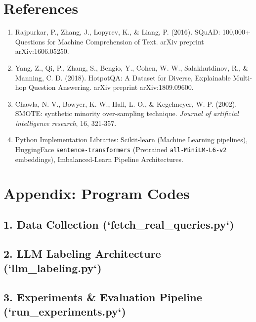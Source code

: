 \documentclass[12pt, a4paper]{article}
\begin{document}
\section{References}
\begin{enumerate}
    \item Rajpurkar, P., Zhang, J., Lopyrev, K., \& Liang, P. (2016). SQuAD: 100,000+ Questions for Machine Comprehension of Text. arXiv preprint arXiv:1606.05250.
    \item Yang, Z., Qi, P., Zhang, S., Bengio, Y., Cohen, W. W., Salakhutdinov, R., \& Manning, C. D. (2018). HotpotQA: A Dataset for Diverse, Explainable Multi-hop Question Answering. arXiv preprint arXiv:1809.09600.
    \item Chawla, N. V., Bowyer, K. W., Hall, L. O., \& Kegelmeyer, W. P. (2002). SMOTE: synthetic minority over-sampling technique. \textit{Journal of artificial intelligence research}, 16, 321-357.
    \item Python Implementation Libraries: Scikit-learn (Machine Learning pipelines), HuggingFace \texttt{sentence-transformers} (Pretrained \texttt{all-MiniLM-L6-v2} embeddings), Imbalanced-Learn Pipeline Architectures. 
\end{enumerate}

\pagebreak
\section*{Appendix: Program Codes}

\subsection*{1. Data Collection (`fetch\_real\_queries.py`)}


\pagebreak
\subsection*{2. LLM Labeling Architecture (`llm\_labeling.py`)}


\pagebreak
\subsection*{3. Experiments \& Evaluation Pipeline (`run\_experiments.py`)}

\end{document}
